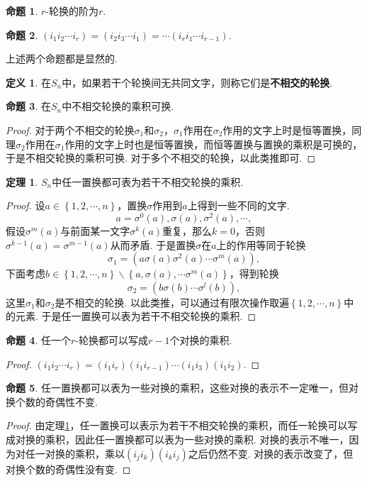 \documentclass[12pt]{ctexart}
\theoremstyle{definition}
\newtheorem{definition}{定义}[section]
\newtheorem{theorem}{定理}[section]
\newtheorem{proposition}{命题}[section]
\theoremstyle{plain}
\begin{document}
\begin{proposition}
	$r$-轮换的阶为$r$.
\end{proposition}
\begin{proposition}
	$(i_1i_2\cdots i_r)=(i_2i_3\cdots i_1)=\cdots (i_ri_1\cdots i_{r-1})$.
\end{proposition}
上述两个命题都是显然的.
\begin{definition}
	在$S_n$中，如果若干个轮换间无共同文字，则称它们是\textbf{不相交的轮换}.
\end{definition}
\begin{proposition}
	在$S_n$中不相交轮换的乘积可换.
\end{proposition}
\begin{proof}
	对于两个不相交的轮换$\sigma_1$和$\sigma_2$，$\sigma_1$作用在$\sigma_2$作用的文字上时是恒等置换，同理$\sigma_2$作用在$\sigma_1$作用的文字上时也是恒等置换，而恒等置换与置换的乘积是可换的，于是不相交轮换的乘积可换. 对于多个不相交的轮换，以此类推即可.
\end{proof}
\begin{theorem}\label{permutationtocycle}
	$S_n$中任一置换都可表为若干不相交轮换的乘积.
\end{theorem}
\begin{proof}
	设$a\in\left\{1,2,\cdots,n\right\}$，置换$\sigma$作用到$a$上得到一些不同的文字.
	$$a=\sigma^{0}(a),\sigma(a),\sigma^2(a),\cdots,$$
	假设$\sigma^m(a)$与前面某一文字$\sigma^k(a)$重复，那么$k=0$，否则$\sigma^{k-1}(a)=\sigma^{m-1}(a)$从而矛盾. 于是置换$\sigma$在$a$上的作用等同于轮换
	$$\sigma_1=(a\sigma(a)\sigma^2(a)\cdots\sigma^{m}(a)),$$
	下面考虑$b\in\left\{1,2,\cdots,n\right\}\backslash\left\{a,\sigma(a),\cdots\sigma^m(a)\right\}$，得到轮换
	$$\sigma_2=(b\sigma(b)\cdots\sigma^l(b)),$$
	这里$\sigma_1$和$\sigma_2$是不相交的轮换. 以此类推，可以通过有限次操作取遍$\left\{1,2,\cdots,n\right\}$中的元素. 于是任一置换可以表为若干不相交轮换的乘积.
\end{proof}
\begin{proposition}
	任一个$r$-轮换都可以写成$r-1$个对换的乘积.
\end{proposition}
\begin{proof}
	$(i_1i_2\cdots i_r)=(i_1i_r)(i_1i_{r-1})\cdots(i_1i_3)(i_1i_2)$.
\end{proof}
\begin{proposition}
	任一置换都可以表为一些对换的乘积，这些对换的表示不一定唯一，但对换个数的奇偶性不变.
\end{proposition}
\begin{proof}
	由定理\ref{permutationtocycle}，任一置换可以表示为若干不相交轮换的乘积，而任一轮换可以写成对换的乘积，因此任一置换都可以表为一些对换的乘积. 对换的表示不唯一，因为对任一对换的乘积，乘以$(i_ji_k)(i_ki_j)$之后仍然不变. 对换的表示改变了，但对换个数的奇偶性没有变.
\end{proof}
\end{document}
